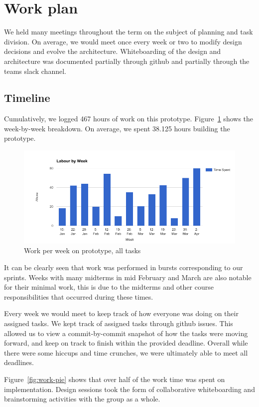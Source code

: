 \section{Work plan}
We held many meetings throughout the term on the subject of planning and task division. On average, we would meet once every week or two to modify design decisions and evolve the architecture. Whiteboarding of the design and architecture was documented partially through github and partially through the teams slack channel.

\subsection{Timeline}
Cumulatively, we logged 467 hours of work on this prototype. Figure~\ref{fig:work-per-week} shows the week-by-week breakdown. On average, we spent 38.125 hours building the prototype. 

\begin{figure}[tbph]
  \centering
  \includegraphics[width=0.85\linewidth]{graphics/work-per-week}
  \caption{Work per week on prototype, all tasks}
  \label{fig:work-per-week}
\end{figure}

It can be clearly seen that work was performed in bursts corresponding to our sprints.  Weeks with many midterms in mid February and March are also notable for their minimal work, this is due to the midterms and other course responsibilities that occurred during these times.

Every week we would meet to keep track of how everyone was doing on their assigned tasks. We kept track of assigned tasks through github issues. This allowed us to view a commit-by-commit snapshot of how the tasks were moving forward, and keep on track to finish within the provided deadline.  Overall while there were some hiccups and time crunches, we were ultimately able to meet all deadlines.

Figure~\ref{fig:work-pie} shows that over half of the work time was spent on implementation. Design sessions took the form of collaborative whiteboarding and brainstorming activities with the group as a whole. 

